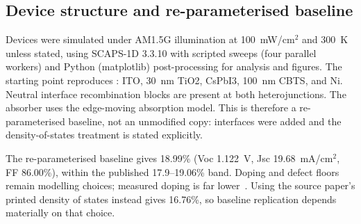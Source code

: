 \documentclass[11pt,a4paper]{article}
\begin{document}
\subsection{Device structure and re-parameterised baseline}

Devices were simulated under AM1.5G illumination at 100~mW/cm$^2$ and 300~K unless stated, using SCAPS-1D 3.3.10 with scripted sweeps (four parallel workers) and Python (matplotlib) post-processing for analysis and figures. The starting point reproduces \citet{Hossain2023}: ITO, 30~nm TiO2, CsPbI3, 100~nm CBTS, and Ni. Neutral interface recombination blocks are present at both heterojunctions. The absorber uses the edge-moving absorption model. This is therefore a re-parameterised baseline, not an unmodified copy: interfaces were added and the density-of-states treatment is stated explicitly.

The re-parameterised baseline gives 18.99\% (Voc 1.122~V, Jsc 19.68~mA/cm$^2$, FF 86.00\%), within the published 17.9--19.06\% band. Doping and defect floors remain modelling choices; measured doping is far lower~\cite{PenaCamargo2022}. Using the source paper's printed density of states instead gives 16.76\%, so baseline replication depends materially on that choice.

\begin{table}[tbp]
\centering
\caption{Layer input parameters for the re-parameterised baseline. Screening subsequently moves ETL doping to $9\times10^{17}$~cm$^{-3}$ and explores ETL affinity; the ceiling values are in Table~\ref{tab:champ}. Effective densities of states are $(N_c,N_v)=(2.2\times10^{18},1.8\times10^{19})$~cm$^{-3}$ for CBTS, $(1.1\times10^{19},8.2\times10^{19})$ for CsPbI3, and $(2.0\times10^{18},1.8\times10^{19})$ for TiO2; contacts are Ni 5.5~eV (back) and ITO 4.0~eV (front) with $S_n=S_p=10^7$~cm/s. All layers use equation-based Eg-sqrt absorption with a 10\% front reflection filter. Parameters follow \citet{Hossain2023} except for the added interfaces and the stated density of states.}
\label{tab:in}
\end{table}
\end{document}
